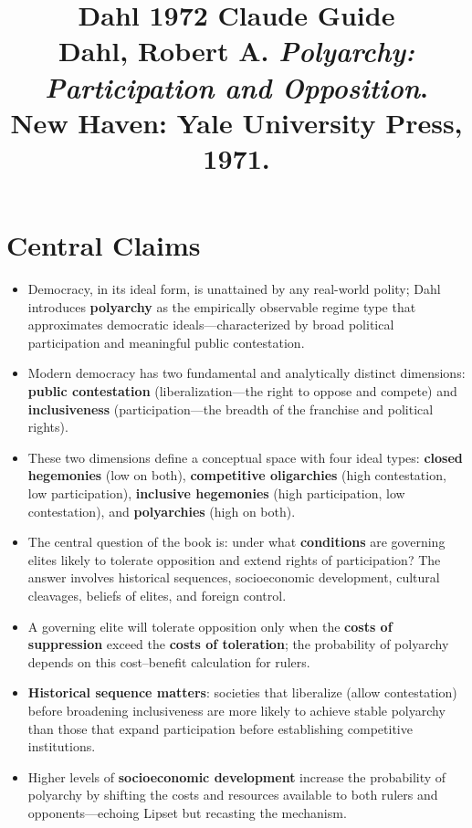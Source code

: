 \documentclass[12pt]{article}
\title{\textbf{Dahl 1972 Claude Guide}\\
\large Dahl, Robert A. \textit{Polyarchy: Participation and Opposition}.\\
New Haven: Yale University Press, 1971.}
\author{}
\date{}
\begin{document}
\maketitle
\tableofcontents
\newpage

\section{Central Claims}

\begin{itemize}[leftmargin=*, itemsep=4pt]
    \item Democracy, in its ideal form, is unattained by any real-world polity; Dahl introduces \textbf{polyarchy} as the empirically observable regime type that approximates democratic ideals---characterized by broad political participation and meaningful public contestation.
    \item Modern democracy has two fundamental and analytically distinct dimensions: \textbf{public contestation} (liberalization---the right to oppose and compete) and \textbf{inclusiveness} (participation---the breadth of the franchise and political rights).
    \item These two dimensions define a conceptual space with four ideal types: \textbf{closed hegemonies} (low on both), \textbf{competitive oligarchies} (high contestation, low participation), \textbf{inclusive hegemonies} (high participation, low contestation), and \textbf{polyarchies} (high on both).
    \item The central question of the book is: under what \textbf{conditions} are governing elites likely to tolerate opposition and extend rights of participation? The answer involves historical sequences, socioeconomic development, cultural cleavages, beliefs of elites, and foreign control.
    \item A governing elite will tolerate opposition only when the \textbf{costs of suppression} exceed the \textbf{costs of toleration}; the probability of polyarchy depends on this cost--benefit calculation for rulers.
    \item \textbf{Historical sequence matters}: societies that liberalize (allow contestation) before broadening inclusiveness are more likely to achieve stable polyarchy than those that expand participation before establishing competitive institutions.
    \item Higher levels of \textbf{socioeconomic development} increase the probability of polyarchy by shifting the costs and resources available to both rulers and opponents---echoing Lipset but recasting the mechanism.

\end{itemize}
\end{document}
